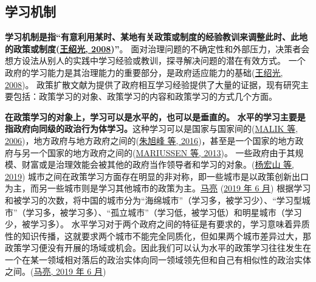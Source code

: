 \documentclass[
  12pt,
]{ctexart}
\begin{document}
\hypertarget{ux5b66ux4e60ux673aux5236}{%
\subsection{学习机制}\label{ux5b66ux4e60ux673aux5236}}

\textbf{学习机制是指``有意利用某时、某地有关政策或制度的经验教训来调整此时、此地的政策或制度(\protect\hyperlink{ref-WangShaoGuang2008a}{王绍光, 2008})''}。
面对治理问题的不确定性和外部压力，决策者会想方设法从别人的实践中学习经验或教训，探寻解决问题的潜在有效方式。
一个政府的学习能力是其治理能力的重要部分，是政府适应能力的基础(\protect\hyperlink{ref-WangShaoGuang2008a}{王绍光, 2008})。
政策扩散文献为提供了政府相互学习经验提供了大量的证据，现有研究主要包括：政策学习的对象、政策学习的内容和政策学习的方式几个方面。

\textbf{在政策学习的对象上，学习可以是水平的，也可以是垂直的。}
\textbf{水平的学习主要是指政府向同级的政治行为体学习。}这种学习可以是国家与国家间的(\protect\hyperlink{ref-MalikCunningham2006}{MALIK 等, 2006})，地方政府与地方政府之间的(\protect\hyperlink{ref-ZhuXuFengZhaoHui2016}{朱旭峰 等, 2016})，甚至是一个国家的地方政府与另一个国家的地方政府之间的(\protect\hyperlink{ref-MariussenVirkkala2013}{MARIUSSEN 等, 2013})。
一些政府由于其规模、财富或是治理效能会被其他的政府当作领导者和学习的对象。(\protect\hyperlink{ref-YangHongShanLiPing2019}{杨宏山 等, 2019})
城市之间在政策学习方面存在明显的非对称，即一些城市是以政策创新出口为主，而另一些城市则是学习其他城市的政策为主。\protect\hyperlink{ref-MaLiang2019}{马亮} (\protect\hyperlink{ref-MaLiang2019}{2019 年 6 月}) 根据学习和被学习的次数，将中国的城市分为``海绵城市''（学习多，被学习少）、``学习型城市''（学习多，被学习多）、``孤立城市''（学习低，被学习低）和明星城市（学习少，被学习多）。
水平学习对于两个政府之间的特征是有要求的，学习意味着异质性的知识传播，这就要求两个城市不能完全同质化，但如果两个城市差异过大，那政策学习便没有开展的场域或机会。因此我们可以认为水平的政策学习往往发生在一个在某一领域相对落后的政治实体向同一领域领先但和自己有相似性的政治实体之间。(\protect\hyperlink{ref-MaLiang2019}{马亮, 2019 年 6 月})
\end{document}
